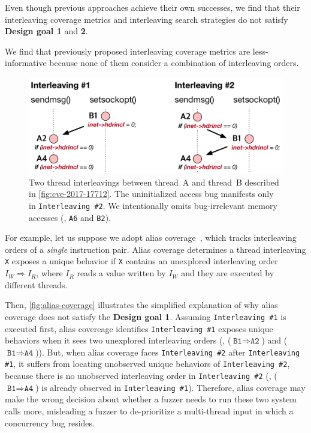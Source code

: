 %
Even though previous approaches achieve their own successes, we find
that their interleaving coverage metrics and interleaving search
strategies do not satisfy \textbf{Design goal 1} and \textbf{2}.


%
We find that previously proposed interleaving coverage metrics are
less-informative because none of them consider a combination of
interleaving orders.

\begin{figure}[t]
  \centering
  \includegraphics[width=0.8\linewidth]{fig/alias-coverage.pdf}
  \caption{Two thread interleavings between thread~A and thread~B
    described in \autoref{fig:cve-2017-17712}.
    The uninitialized access bug manifests only in
    \texttt{Interleaving \#2}.
    We intentionally omits bug-irrelevant memory accesses (\ie,
    \texttt{A6} and \texttt{B2}).}
  \label{fig:alias-coverage}
\end{figure}



For example, let us suppose we adopt alias coverage~\cite{krace},
which tracks interleaving orders of a \textit{single} instruction
pair.
%
Alias coverage determines a thread interleaving \texttt{X} exposes a
unique behavior if \texttt{X} contains an unexplored interleaving
order $I_W \Rightarrow I_R$, where $I_R$ reads a value written by
$I_W$ and they are executed by different threads.

Then, \autoref{fig:alias-coverage} illustrates the simplified
explanation of why alias coverage does not satisfy the \textbf{Design
  goal 1}.
%
Assuming \texttt{Interleaving \#1} is executed first, alias covereage
identifies \texttt{Interleaving \#1} exposes unique behaviors when it
sees two unexplored interleaving orders (\ie,
($\texttt{B1} \Rightarrow \texttt{A2}$) and
($\texttt{B1} \Rightarrow \texttt{A4}$)).
%
But, when alias coverage faces \texttt{Interleaving \#2} after
\texttt{Interleaving \#1}, it suffers from locating unobserved unique
behaviors of \texttt{Interleaving \#2}, because there is no unobserved
interleaving order in \texttt{Interleaving \#2} (\ie,
($\texttt{B1} \Rightarrow \texttt{A4}$) is already observed in
\texttt{Interleaving \#1}).
%
Therefore, alias coverage may make the wrong decision about whether a
fuzzer needs to run these two system calls more, misleading a fuzzer
to de-prioritize a multi-thread input in which a concurrency bug
resides.


